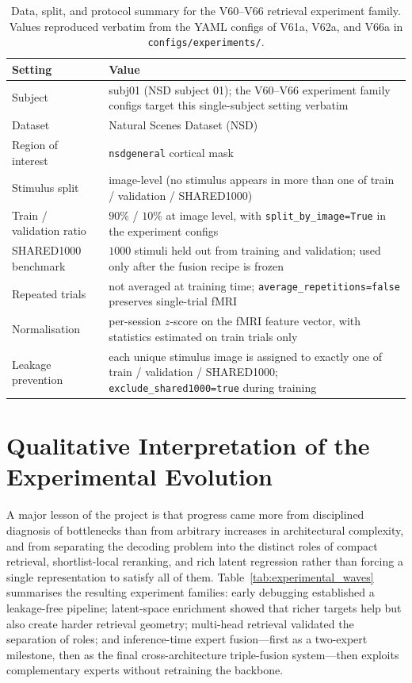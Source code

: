 \begin{table}[htbp]
\centering
\small
\begin{tabularx}{\textwidth}{>{\raggedright\arraybackslash}p{4.0cm} >{\raggedright\arraybackslash}X}
\toprule
\textbf{Setting} & \textbf{Value} \\
\midrule
Subject & subj01 (NSD subject 01); the V60--V66 experiment family configs target this single-subject setting verbatim \\
Dataset & Natural Scenes Dataset (NSD) \cite{Allen2022} \\
Region of interest & \texttt{nsdgeneral} cortical mask \\
Stimulus split & image-level (no stimulus appears in more than one of train / validation / SHARED1000) \\
Train / validation ratio & $90\%$ / $10\%$ at image level, with \texttt{split\_by\_image=True} in the experiment configs \\
SHARED1000 benchmark & $1000$ stimuli held out from training and validation; used only after the fusion recipe is frozen \\
Repeated trials & not averaged at training time; \texttt{average\_repetitions=false} preserves single-trial fMRI \\
Normalisation & per-session $z$-score on the fMRI feature vector, with statistics estimated on train trials only \\
Leakage prevention & each unique stimulus image is assigned to exactly one of train / validation / SHARED1000; \texttt{exclude\_shared1000=true} during training \\
\bottomrule
\end{tabularx}
\caption{Data, split, and protocol summary for the V60--V66 retrieval experiment family. Values reproduced verbatim from the YAML configs of V61a, V62a, and V66a in \texttt{configs/experiments/}.}
\label{tab:protocol}
\end{table}

\section{Qualitative Interpretation of the Experimental Evolution}

A major lesson of the project is that progress came more from disciplined diagnosis of bottlenecks than from arbitrary increases in architectural complexity, and from separating the decoding problem into the distinct roles of compact retrieval, shortlist-local reranking, and rich latent regression rather than forcing a single representation to satisfy all of them. Table~\ref{tab:experimental_waves} summarises the resulting experiment families: early debugging established a leakage-free pipeline; latent-space enrichment showed that richer targets help but also create harder retrieval geometry; multi-head retrieval validated the separation of roles; and inference-time expert fusion---first as a two-expert milestone, then as the final cross-architecture triple-fusion system---then exploits complementary experts without retraining the backbone.

